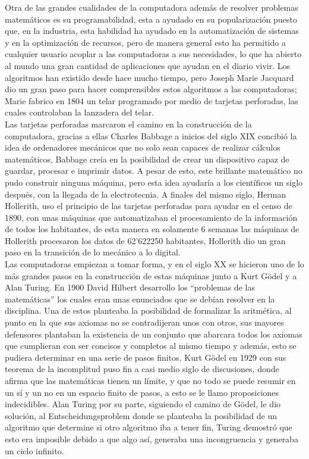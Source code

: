 \documentclass{article}
\begin{document}
Otra de las grandes cualidades de la computadora además de resolver problemas matemáticos es su programabilidad, esta a ayudado en su popularización puesto que, en la industria, esta habilidad ha ayudado en la automatización de sistemas y en la optimización de recursos, pero de manera general esto ha permitido a cualquier usuario acoplar a las computadoras a sus necesidades, lo que ha abierto al mundo una gran cantidad de aplicaciones que ayudan en el diario vivir. Los algoritmos han existido desde hace mucho tiempo, pero Joseph Marie Jacquard dio un gran paso para hacer comprensibles estos algoritmos a las computadoras; Marie fabrico en 1804 un telar programado por medio de tarjetas perforadas, las cuales controlaban la lanzadera del telar. \\

Las tarjetas perforadas marcaron el camino en la construcción de la computadora, gracias a ellas Charles Babbage a inicios del siglo XIX concibió la idea de ordenadores mecánicos que no solo sean capaces de realizar cálculos matemáticos, Babbage creía en la posibilidad de crear un dispositivo capaz de guardar, procesar e imprimir datos. A pesar de esto, este brillante matemático no pudo construir ninguna máquina, pero esta idea ayudaría a los científicos un siglo después, con la llegada de la electrotecnia. A finales del mismo siglo, Herman Hollerith, uso el principio de las tarjetas perforadas para ayudar en el censo de 1890, con unas máquinas que automatizaban el procesamiento de la información de todos los habitantes, de esta manera en solamente 6 semanas las máquinas de Hollerith procesaron los datos de 62’622250 habitantes, Hollerith dio un gran paso en la transición de lo mecánico a lo digital.\\

Las computadoras empiezan a tomar forma, y en el siglo XX se hicieron uno de lo más grandes pasos en la construcción de estas máquinas junto a Kurt Gödel y a Alan Turing. En 1900 David Hilbert desarrollo los “problemas de las matemáticas” los cuales eran unas enunciados que se debían resolver en la disciplina. Una de estos planteaba la posibilidad de formalizar la aritmética, al punto en la que sus axiomas no se contradijeran unos con otros, sus mayores defensores plantaban la existencia de un conjunto que abarcara todos los axiomas que cumplieran con ser concisos y completos al mismo tiempo y además, esto se pudiera determinar en una serie de pasos finitos. Kurt Gödel en 1929 con sus teorema de la incomplitud puso fin a casi medio siglo de discusiones, donde afirma que las matemáticas tienen un límite, y que no todo se puede resumir en un sí y un no en un espacio finito de pasos, a esto se le llamo proposiciones indecidibles. Alan Turing por su parte, siguiendo el camino de Gödel, le dio solución, al Entscheidungsproblem donde se planteaba la posibilidad de un algoritmo que determine si otro algoritmo iba a tener fin, Turing demostró que esto era imposible debido a que algo así, generaba una incongruencia y generaba un ciclo infinito.\\
\end{document}
